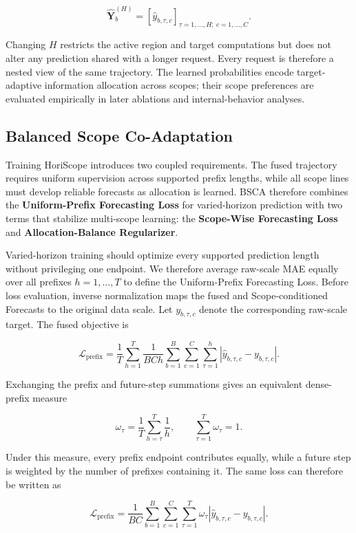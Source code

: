 \documentclass[final,3p,times]{elsarticle}
\begin{document}
\[
\widehat{\mathbf Y}_b^{(H)}
=
\left[
\widehat y_{b,\tau,c}
\right]_{\tau=1,\ldots,H;\ c=1,\ldots,C}.
\]


Changing $H$ restricts the active region and target computations but does not alter any prediction shared with a longer request. Every request is therefore a nested view of the same trajectory. The learned probabilities encode target-adaptive information allocation across scopes; their scope preferences are evaluated empirically in later ablations and internal-behavior analyses.

\subsection{Balanced Scope Co-Adaptation}


Training HoriScope introduces two coupled requirements. The fused trajectory requires uniform supervision across supported prefix lengths, while all scope lines must develop reliable forecasts as allocation is learned. BSCA therefore combines the \textbf{Uniform-Prefix Forecasting Loss} for varied-horizon prediction with two terms that stabilize multi-scope learning: the \textbf{Scope-Wise Forecasting Loss} and \textbf{Allocation-Balance Regularizer}.

Varied-horizon training should optimize every supported prediction length without privileging one endpoint. We therefore average raw-scale MAE equally over all prefixes $h=1,\ldots,T$ to define the Uniform-Prefix Forecasting Loss. Before loss evaluation, inverse normalization maps the fused and Scope-conditioned Forecasts to the original data scale. Let $y_{b,\tau,c}$ denote the corresponding raw-scale target. The fused objective is

\[
\mathcal L_{\mathrm{prefix}}
=
\frac{1}{T}
\sum_{h=1}^{T}
\frac{1}{BCh}
\sum_{b=1}^{B}
\sum_{c=1}^{C}
\sum_{\tau=1}^{h}
\left|
\widehat y_{b,\tau,c}-y_{b,\tau,c}
\right|.
\]


Exchanging the prefix and future-step summations gives an equivalent dense-prefix measure

\[
\omega_\tau
=
\frac{1}{T}
\sum_{h=\tau}^{T}
\frac{1}{h},
\qquad
\sum_{\tau=1}^{T}\omega_\tau=1.
\]


Under this measure, every prefix endpoint contributes equally, while a future step is weighted by the number of prefixes containing it. The same loss can therefore be written as

\[
\mathcal L_{\mathrm{prefix}}
=
\frac{1}{BC}
\sum_{b=1}^{B}
\sum_{c=1}^{C}
\sum_{\tau=1}^{T}
\omega_\tau
\left|
\widehat y_{b,\tau,c}-y_{b,\tau,c}
\right|.
\]
\end{document}
